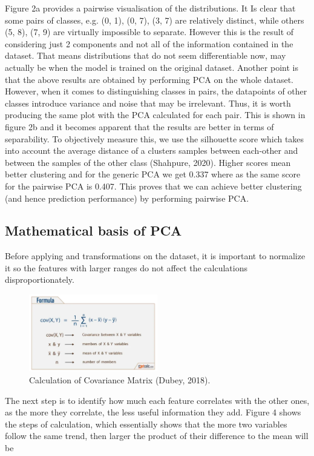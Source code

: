 \documentclass{article}
\begin{document}
Figure 2a provides a pairwise visualisation of the distributions.
It Is clear that some pairs of classes, e.g. (0, 1), (0, 7), (3, 7) are relatively distinct, while others (5, 8), (7, 9) are virtually impossible to separate.
However this is the result of considering just 2 components and not all of the information contained in the dataset.
That means distributions that do not seem differentiable now, may actually be when the model is trained on the original dataset.
Another point is that the above results are obtained by performing PCA on the whole dataset.
However, when it comes to distinguishing classes in pairs, the datapoints of other classes introduce variance and noise that may be irrelevant.
Thus, it is worth producing the same plot with the PCA calculated for each pair.
This is shown in figure 2b and it becomes apparent that the results are better in terms of separability.
To objectively measure this, we use the silhouette score which takes into account the average distance of a clusters samples between each-other and between the samples of the other class (Shahpure, 2020).
Higher scores mean better clustering and for the generic PCA we get 0.337 where as the same score for the pairwise PCA is 0.407.
This proves that we can achieve better clustering (and hence prediction performance) by performing pairwise PCA.


\subsection{Mathematical basis of PCA}
Before applying and transformations on the dataset, it is important to normalize it so the features with larger ranges do not affect the calculations disproportionately. 

\begin{figure}[h!]
    \centering
    \includegraphics[width=0.5\textwidth]{./plots/plot4.png}
    \caption{Calculation of Covariance Matrix (Dubey, 2018).}
    \label{fig:plot3}
\end{figure}

The next step is to identify how much each feature correlates with the other ones, as the more they correlate, the less useful information they add.
Figure 4 shows the steps of calculation, which essentially shows that the more two variables follow the same trend, then larger the product of their difference to the mean will be
\end{document}
